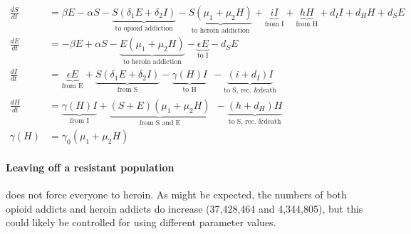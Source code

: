 \documentclass[11pt]{report}
\begin{document}
\begin{align*}
\frac{dS}{dt} &= \beta E - \alpha S - \underbrace{S(\delta_1 E + \delta_2 I)}_{\text{to opioid addiction}} - \underbrace{S(\mu_1+\mu_2H)}_{\text{to heroin addiction}} 
+ \underbrace{iI}_{\text{from I}} + \underbrace{hH}_{\text{from H}} 
+ d_I I + d_H H + d_S E\\
\frac{dE}{dt} &= - \beta E + \alpha S - \underbrace{E(\mu_1 + \mu_2H)}_{\text{to heroin addiction}} - \underbrace{\epsilon E}_{\text{to I}} - d_S E\\
\frac{dI}{dt} &= \underbrace{\epsilon E}_{\text{from E}} + \underbrace{S(\delta_1E+\delta_2I)}_{\text{from S}} - \underbrace{\gamma(H)I}_{\text{to H}}\ \ 
- \underbrace{(i+d_I)I}_{\text{to S, rec. \& death}}\\
\frac{dH}{dt} &= \underbrace{\gamma(H)I}_{\text{from I}} + \underbrace{(S+E)(\mu_1+\mu_2H)}_{\text{from S and E}}\ \ - \underbrace{(h+d_H)H}_{\text{to S, rec. \& death}}\\
\gamma(H) &= \gamma_0(\mu_1+\mu_2H)
\end{align*}

\paragraph{Leaving off a resistant population} does not force everyone to heroin. As might be expected, the numbers of both opioid addicts and heroin addicts do increase (37,428,464 and 4,344,805), but this could likely be controlled for using different parameter values.
\end{document}
